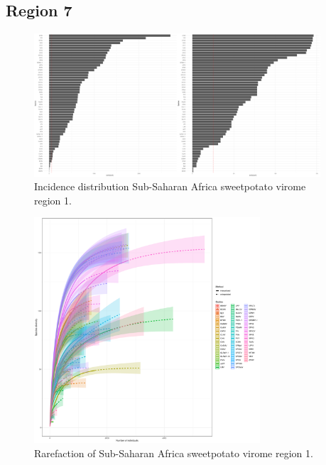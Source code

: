 \documentclass{article}
\begin{document}
\subsection{Region 7}

\begin{figure}[h!]
\begin{center}
\includegraphics[width=0.95\textwidth]{../results/k-cluster7/7-kcluster_incidence_w+bFeb28.pdf
} %
\caption{Incidence distribution Sub-Saharan Africa sweetpotato virome region 1.}
\end{center}
\end{figure}


\begin{figure}[h!]
\begin{center}
\includegraphics[width=0.75\textwidth]{../results/k-cluster7/7-kcluster_rarefaction-iNEXT_Feb28.pdf
} %
\caption{Rarefaction of Sub-Saharan Africa sweetpotato virome region 1.}
\end{center}
\end{figure}
\end{document}
